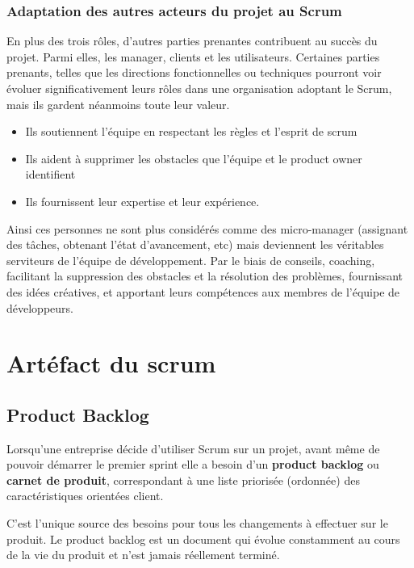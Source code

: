 \subsubsection{Adaptation des autres acteurs du projet au Scrum}

En plus des trois rôles, d'autres parties prenantes contribuent au succès du projet. Parmi elles, les manager, clients et les utilisateurs. 
Certaines parties prenants, telles que les directions fonctionnelles ou techniques pourront voir évoluer significativement leurs rôles dans une organisation adoptant le Scrum, mais ils gardent néanmoins toute leur valeur. 

\begin{itemize}
    \item Ils soutiennent l'équipe en respectant les règles et l'esprit de scrum
    \item Ils aident à supprimer les obstacles que l'équipe et le product owner identifient
    \item Ils fournissent leur expertise et leur expérience. 
\end{itemize}

Ainsi ces personnes ne sont plus considérés comme des micro-manager (assignant des tâches, obtenant l'état d'avancement, etc) mais deviennent les véritables serviteurs de l'équipe de développement. 
Par le biais de conseils, coaching, facilitant la suppression des obstacles et la résolution des problèmes, fournissant des idées créatives, et apportant leurs compétences aux membres de l'équipe de développeurs.


\section{Artéfact du scrum}

\subsection{Product Backlog}

Lorsqu'une entreprise décide d'utiliser Scrum sur un projet, avant même de pouvoir démarrer le premier sprint elle a besoin d'un \textbf{product backlog} ou \textbf{carnet de produit}, correspondant à une liste priorisée (ordonnée) des caractéristiques orientées client. 

C'est l'unique source des besoins pour tous les changements à effectuer sur le produit. 
Le product backlog est un document qui évolue constamment au cours de la vie du produit et n'est jamais réellement terminé. 

